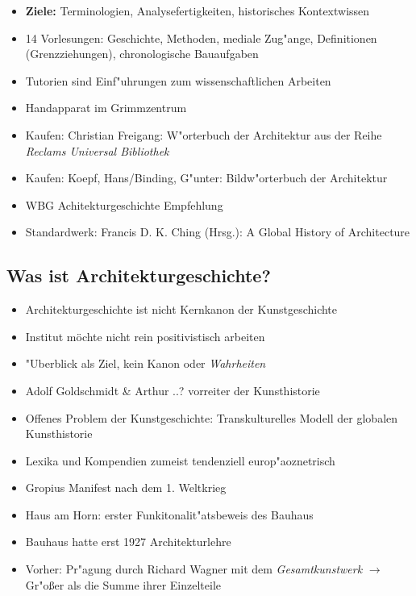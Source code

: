 \documentclass[]{scrartcl}
\begin{document}
\begin{itemize}
    \item \textbf{Ziele:} Terminologien, Analysefertigkeiten, historisches Kontextwissen
\item 14 Vorlesungen: Geschichte, Methoden, mediale Zug"ange, Definitionen (Grenzziehungen), chronologische Bauaufgaben
\item Tutorien sind Einf"uhrungen zum wissenschaftlichen Arbeiten
  \item Handapparat im Grimmzentrum
  \item Kaufen: Christian Freigang: W"orterbuch der Architektur aus der Reihe \emph{Reclams Universal Bibliothek}
    \item Kaufen: Koepf, Hans/Binding, G"unter: Bildw"orterbuch der Architektur
    \item WBG Achitekturgeschichte Empfehlung
    \item Standardwerk: Francis D. K. Ching (Hrsg.): A Global History of Architecture
    

\end{itemize}


\subsection{Was ist Architekturgeschichte?}

\begin{itemize}

    \item Architekturgeschichte ist nicht Kernkanon der Kunstgeschichte
    \item Institut möchte nicht rein positivistisch arbeiten
    \item "Uberblick als Ziel, kein Kanon oder \emph{Wahrheiten}
    \item Adolf Goldschmidt \& Arthur ..? vorreiter der Kunsthistorie
    \item Offenes Problem der Kunstgeschichte: Transkulturelles Modell der globalen Kunsthistorie
    \item Lexika und Kompendien zumeist tendenziell europ"aoznetrisch
    \item Gropius Manifest nach dem 1. Weltkrieg
    \item Haus am Horn: erster Funkitonalit"atsbeweis des Bauhaus
    \item Bauhaus hatte erst 1927 Architekturlehre
    \item Vorher: Pr"agung durch Richard Wagner mit dem \emph{Gesamtkunstwerk} $\rightarrow$ Gr"oßer als die Summe ihrer Einzelteile

\end{itemize}
\end{document}
